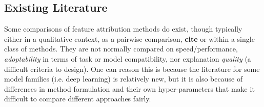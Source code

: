 \documentclass[main]{subfiles}
\begin{document}
\subsection*{Existing Literature}

Some comparisons of feature attribution methods do exist, though typically either in a qualitative context, as a pairwise comparison, \textbf{cite} or within a single class of methods. They are not normally compared on speed/performance, \textit{adoptability} in terms of task or model compatibility, nor explanation \textit{quality} (a difficult criteria to design). One can reason this is because the literature for some model families (i.e. deep learning) is relatively new, but it is also because of differences in method formulation and their own hyper-parameters that make it difficult to compare different approaches fairly.





\end{document}
